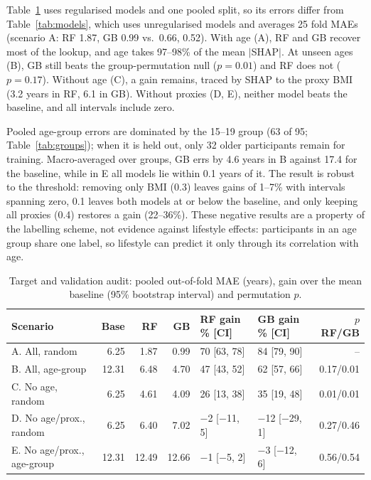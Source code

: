 \documentclass[runningheads]{llncs}
\begin{document}
Table~\ref{tab:leak} uses regularised models and one pooled split, so its errors differ from
Table~\ref{tab:models}, which uses unregularised models and averages 25 fold MAEs (scenario A: RF
1.87, GB 0.99 vs.\ 0.66, 0.52). With age (A), RF and GB recover most of the lookup, and age takes
97--98\% of the mean $|$SHAP$|$. At unseen ages (B), GB still beats the group-permutation null
($p=0.01$) and RF does not ($p=0.17$). Without age (C), a gain remains, traced by SHAP to the proxy
BMI (3.2 years in RF, 6.1 in GB). Without proxies (D, E), neither model beats the baseline, and all
intervals include zero.

Pooled age-group errors are dominated by the 15--19 group (63 of 95; Table~\ref{tab:groups}); when
it is held out, only 32 older participants remain for training. Macro-averaged over groups, GB errs
by 4.6 years in B against 17.4 for the baseline, while in E all models lie within 0.1 years of it.
The result is robust to the threshold: removing only BMI (0.3) leaves gains of 1--7\% with
intervals spanning zero, 0.1 leaves both models at or below the baseline, and only keeping all
proxies (0.4) restores a gain (22--36\%). These negative results are a property of the labelling
scheme, not evidence against lifestyle effects: participants in an age group share one label, so
lifestyle can predict it only through its correlation with age.

\begin{table}[t]
\centering
\caption{Target and validation audit: pooled out-of-fold MAE (years), gain over the mean baseline
(95\% bootstrap interval) and permutation $p$.}\label{tab:leak}
\scriptsize\setlength{\tabcolsep}{4pt}
\begin{tabular}{@{}lrrrllr@{}}
\toprule
Scenario & Base & RF & GB & RF gain \% [CI] & GB gain \% [CI] & $p$ RF/GB \\
\midrule
A. All, random & 6.25 & 1.87 & 0.99 & 70 [63, 78] & 84 [79, 90] & -- \\
B. All, age-group & 12.31 & 6.48 & 4.70 & 47 [43, 52] & 62 [57, 66] & 0.17/0.01 \\
C. No age, random & 6.25 & 4.61 & 4.09 & 26 [13, 38] & 35 [19, 48] & 0.01/0.01 \\
D. No age/prox., random & 6.25 & 6.40 & 7.02 & $-$2 [$-$11, 5] & $-$12 [$-$29, 1] & 0.27/0.46 \\
E. No age/prox., age-group & 12.31 & 12.49 & 12.66 & $-$1 [$-$5, 2] & $-$3 [$-$12, 6] & 0.56/0.54 \\
\bottomrule
\end{tabular}
\end{table}
\end{document}
